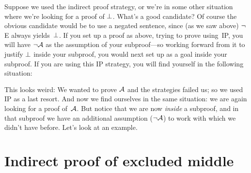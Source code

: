 Suppose we used the indirect proof strategy, or we're in some other situation where we're looking for a proof of $\bot$.  What's a good candidate? Of course the obvious candidate would be to use a negated sentence, since (as we saw above) $\neg$E always yields~$\bot$. If you set up a proof as above, trying to prove  using~IP, you will have $\neg \mathcal{A}$ as the assumption of your subproof---so working forward from it to justify $\bot$ inside your subproof, you would next set up  as a goal inside your subproof. If you are using this IP strategy, you will find yourself in the following situation: 
\begin{fitchproof}
\open
{}
\ellipsesline
{}
\close
{}
\end{fitchproof} 
This looks weird: We wanted to prove $\mathcal{A}$ and the strategies failed us; so we used IP as a last resort. And now we find ourselves in the same situation: we are again looking for a proof of~$\mathcal{A}$. But notice that we are now \emph{inside} a subproof, and in that subproof we have an additional assumption ($\neg \mathcal{A}$) to work with which we didn't have before. Let's look at an example.

\section{Indirect proof of excluded middle}\label{s:proofLEM}

